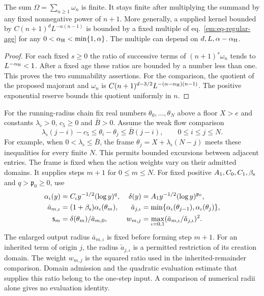 \documentclass[11pt,letterpaper,reqno]{amsart}
\makeatletter
\numberwithin{equation}{section}
\renewcommand{\eqref}[1]{\textup{eq.~\ref{#1}}}
\theoremstyle{definition}
\newcommand{\ms@minorstart}{%
  \pushQED{\qed}\renewcommand{\qedsymbol}{$\blacksquare$}}
\newenvironment{lemma}[1][]{\ms@minorstart\ms@lemma[#1]}
  {\popQED\endms@lemma}
\theoremstyle{remark}
\makeatother
\begin{document}
\begin{lemma}[Summability of regular ages]\label{em:lem-age-kernel}
The sum $\Omega=\sum_{n\ge1}\omega_n$ is finite. It stays finite
after multiplying the summand by any fixed nonnegative power of
$n+1$. More generally, a supplied kernel bounded by
$C(n+1)^dL^{-\alpha(n-1)}$ is bounded by a fixed multiple of
\eqref{em:eq-regular-age} for any
$0<\alpha_{\rm H}<\min\{1,\alpha\}$. The multiple can depend
on $d,L,\alpha-\alpha_{\rm H}$.
\end{lemma}

\begin{proof}
For each fixed $s\ge0$ the ratio of successive terms of
$(n+1)^s\omega_n$ tends to $L^{-\alpha_{\rm H}}<1$. After a
fixed age these ratios are bounded by a number less than one.
This proves the two summability assertions. For the comparison,
the quotient of the proposed majorant and $\omega_n$ is
$C(n+1)^{d-3/2}L^{-(\alpha-\alpha_{\rm H})(n-1)}$. The positive
exponential reserve bounds this quotient uniformly in $n$.
\end{proof}

For the running-radius chain fix real numbers
$\theta_0,\ldots,\theta_N$ above a floor $X>e$ and constants
$\lambda_\flat>0$, $c_5\ge0$ and $\bar B>0$. Assume the weak
flow comparison
\begin{equation}\label{em:eq-weak-flow}
  \lambda_\flat(j-i)-c_5\le\theta_i-\theta_j
                     \le\bar B(j-i),\qquad 0\le i\le j\le N.
\end{equation}
For example, when $0<\lambda_\flat\le\bar B$, the frame
$\theta_j=X+\lambda_\flat(N-j)$ meets these inequalities for
every finite $N$.
This permits bounded excursions between adjacent entries. The
frame is fixed when the action weights vary on their admitted
domains. It supplies steps $m+1$ for $0\le m\le N$.
For fixed positive $A_1,C_0,C_1,\beta_{\rm s}$ and
$q>\mathfrak p_0\ge0$, use
\begin{align}
  \alpha_\iota(y)&=C_\iota y^{-1/2}(\log y)^q,
          &\delta(y)&=A_1y^{-1/2}(\log y)^{\mathfrak p_0},\nonumber\\
  \bar a_{m,\iota}&=(1+\beta_{\rm s})\alpha_\iota(\theta_m),
          &\check a_{j,\iota}&=\min\{\alpha_\iota(\theta_{j-1}),
                                      \alpha_\iota(\theta_j)\},
  \label{em:eq-running-radii}\\
  \mathsf s_m&=\delta(\theta_m)/\bar a_{m,0},
          &w_{m,j}&=\max_{\iota=0,1}
                       (\bar a_{m,\iota}/\check a_{j,\iota})^2.
  \label{em:eq-running-weight}
\end{align}
The enlarged output radius $\bar a_{m,\iota}$ is fixed before
forming step $m+1$. For an inherited term of origin $j$, the
radius $\check a_{j,\iota}$ is a permitted restriction of its
creation domain. The weight $w_{m,j}$ is the squared ratio
used in the inherited-remainder comparison. Domain admission and
the quadratic evaluation estimate that supplies this ratio belong
to the one-step input. A comparison of numerical radii alone
gives no evaluation identity.
\end{document}
